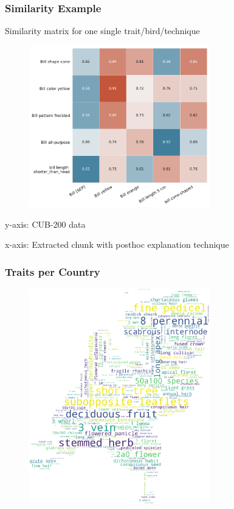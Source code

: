 \documentclass{beamer}
\begin{document}
\begin{frame}
\frametitle{Similarity Example}
Similarity matrix for one single trait/bird/technique

\begin{figure} [htbp]
    \centering
    \includegraphics[width=0.7\textwidth]{similarity_matrix.pdf}
\end{figure}

y-axis: CUB-200 data

x-axis: Extracted chunk with posthoc explanation technique
\end{frame}

\begin{frame}
\frametitle{Traits per Country}

\begin{figure}
    \centering
    \includegraphics[width=0.7\textwidth]{figures/cover_words.pdf}
\end{figure}

\end{frame}
\end{document}
